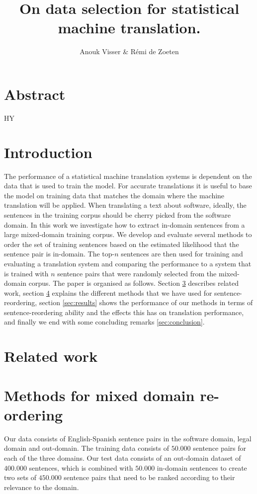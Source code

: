 \documentclass[11pt]{article}
\title{On data selection for statistical machine translation.}
\author{Anouk Visser \& R\'emi de Zoeten}
\date{}
\begin{document}
\maketitle
\newpage
\tableofcontents
\newpage

\section{Abstract}
HY

\section{Introduction}
\label{sec:intro}
The performance of a statistical machine translation systems is dependent on the data that is used to train the model. For accurate translations it is useful to base the model on training data that matches the domain where the machine translation will be applied. When translating a text about software, ideally, the sentences in the training corpus should be cherry picked from the software domain. 
In this work we investigate how to extract in-domain sentences from a large mixed-domain training corpus. We develop and evaluate several methods to order the set of training sentences based on the estimated likelihood that the sentence pair is in-domain. The top-$n$ sentences are then used for training and evaluating a translation system and comparing the performance to a system that is trained with $n$ sentence pairs that were randomly selected from the mixed-domain corpus.
The paper is organised as follows. Section \ref{sec:related} describes related work, section \ref{sec:methods} explains the different methods that we have used for sentence-reordering, section \ref{sec:results} shows the performance of our methods in terms of sentence-reordering ability and the effects this has on translation performance, and finally we end with some concluding remarks \ref{sec:conclusion}.

\section{Related work}
\label{sec:related}

\section{Methods for mixed domain re-ordering}
\label{sec:methods}
Our data consists of English-Spanish sentence pairs in the software domain, legal domain and out-domain.
The training data consists of $50.000$ sentence pairs for each of the three domains.
Our test data consists of an out-domain dataset of $400.000$ sentences, which is combined with $50.000$ in-domain sentences to create two sets of $450.000$ sentence pairs that need to be ranked according to their relevance to the domain.
\end{document}
